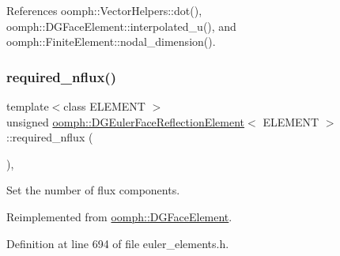 References oomph\+::\+Vector\+Helpers\+::dot(), oomph\+::\+D\+G\+Face\+Element\+::interpolated\+\_\+u(), and oomph\+::\+Finite\+Element\+::nodal\+\_\+dimension().

\mbox{\label{classoomph_1_1DGEulerFaceReflectionElement_a51f6048bc1f1c033933c65430dd0c323}} 
\subsubsection{\texorpdfstring{required\+\_\+nflux()}{required\_nflux()}}
{\footnotesize\ttfamily template$<$class E\+L\+E\+M\+E\+NT $>$ \\
unsigned \hyperlink{classoomph_1_1DGEulerFaceReflectionElement}{oomph\+::\+D\+G\+Euler\+Face\+Reflection\+Element}$<$ E\+L\+E\+M\+E\+NT $>$\+::required\+\_\+nflux (\begin{DoxyParamCaption}{ }\end{DoxyParamCaption})\hspace{0.3cm}{\ttfamily [inline]}, {\ttfamily [virtual]}}



Set the number of flux components. 



Reimplemented from \hyperlink{classoomph_1_1DGFaceElement_af45b5a88226a143c8fafbc5f3e097526}{oomph\+::\+D\+G\+Face\+Element}.



Definition at line 694 of file euler\+\_\+elements.\+h.

\mbox{\label{classoomph_1_1DGEulerFaceReflectionElement_a0abd251e086372b7d18e06713890e25c}} 
